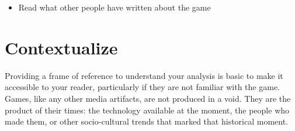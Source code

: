 \documentclass[
]{book}
\providecommand{\tightlist}{%
  \setlength{\itemsep}{0pt}\setlength{\parskip}{0pt}}
\begin{document}
\begin{itemize}
\tightlist
\item
  Read what other people have written about the game
\end{itemize}

\hypertarget{contextualize}{%
\section{Contextualize}\label{contextualize}}

Providing a frame of reference to understand your analysis is basic to make it
accessible to your reader, particularly if they are not familiar with the game.
Games, like any other media artifacts, are not produced in a void. They are the
product of their times: the technology available at the moment, the people who
made them, or other socio-cultural trends that marked that historical moment.
\end{document}
